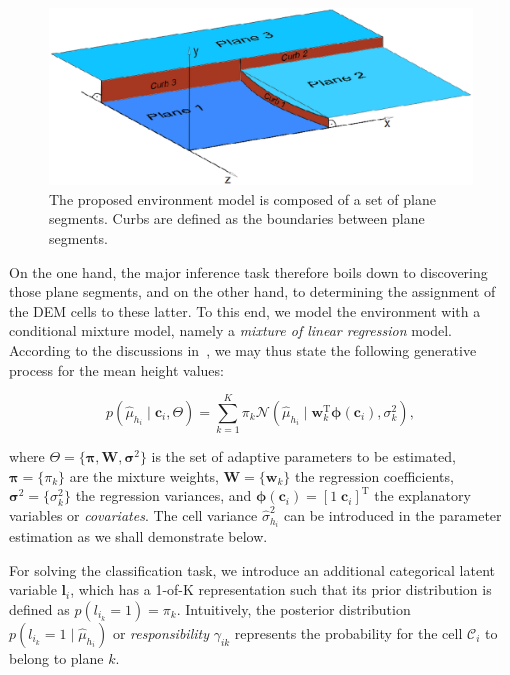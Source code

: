\begin{figure}[t]
\centering
\includegraphics[width=\columnwidth]{fig/model.eps}
\caption{The proposed environment model is composed of a set of plane segments.
Curbs are defined as the boundaries between plane segments.}
\label{fig:model}
\end{figure}

On the one hand, the major inference task therefore boils down to discovering
those plane segments, and on the other hand, to determining the assignment of
the DEM cells to these latter. To this end, we model the environment with a
conditional mixture model, namely a \emph{mixture of linear regression} model.
According to the discussions in~\cite{bishop06pattern}, we may thus state the
following generative process for the mean height values:

\begin{equation}
\label{eqn:mixture}
p(\hat{\mu}_{h_i}\mid\mathbf{c}_i, \Theta)=\sum_{k=1}^K\pi_k\mathcal{N}
(\hat{\mu}_{h_i}\mid\mathbf{w}_k^\text{T}\boldsymbol{\phi}(\mathbf{c}_i),
\sigma^2_k),
\end{equation}

where $\Theta=\{\boldsymbol{\pi},\mathbf{W},\boldsymbol{\sigma}^2\}$ is the set
of adaptive parameters to be estimated, $\boldsymbol{\pi}=\{\pi_k\}$ are the
mixture weights, $\mathbf{W}=\{\mathbf{w}_k\}$ the regression coefficients,
$\boldsymbol{\sigma}^2=\{\sigma^2_k\}$ the regression variances, and
$\boldsymbol{\phi}(\mathbf{c}_i)=[1\;\mathbf{c}_i]^\text{T}$ the explanatory
variables or \emph{covariates}. The cell variance $\hat{\sigma}^2_{h_i}$ can
be introduced in the parameter estimation as we shall demonstrate below.

For solving the classification task, we introduce an additional categorical
latent variable $\mathbf{l}_i$, which has a 1-of-K representation such that
its prior distribution is defined as $p(l_{i_k}=1)=\pi_k$. Intuitively, the
posterior distribution $p(l_{i_k}=1\mid\hat{\mu}_{h_i})$ or
\emph{responsibility} $\gamma_{ik}$ represents the probability for the cell
$\mathcal{C}_i$ to belong to plane $k$.

